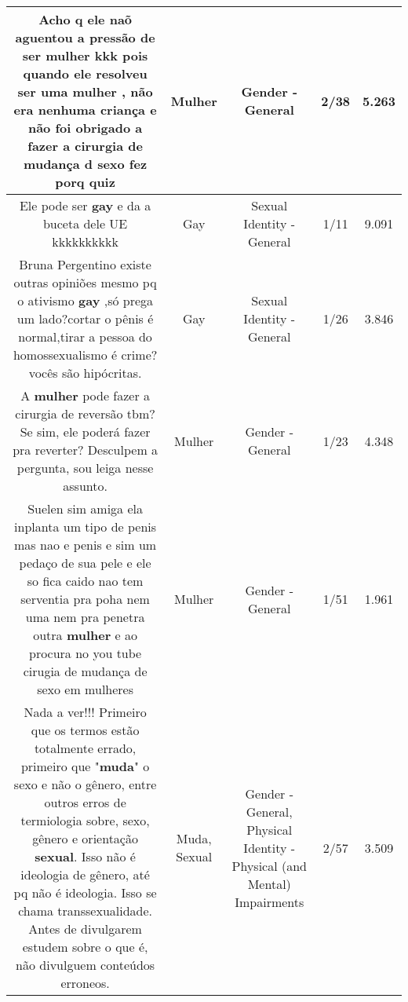 \documentclass[11pt]{article}
\newlength\mylength
\begin{document}
\begin{center}
\begin{longtable}{|C{.65\mylength}|C{.30\mylength}|C{.12\mylength}|C{.12\mylength}|C{.12\mylength}|}
  \small Acho q ele naõ aguentou a pressão de ser \textbf{mulher}  kkk pois quando ele resolveu ser uma \textbf{mulher} , não era nenhuma criança e não foi obrigado a fazer a cirurgia   de mudança d sexo   fez  porq quiz\normalsize   & Mulher & Gender - General & 2/38 & 5.263 \\  \hline
  \small Ele pode ser \textbf{gay} e da a buceta dele UE kkkkkkkkkk\normalsize   & Gay & Sexual Identity - General & 1/11 & 9.091 \\  \hline
  \small Bruna Pergentino  existe outras opiniões mesmo pq o ativismo \textbf{gay} ,só prega um lado?cortar o pênis é normal,tirar a pessoa do homossexualismo é crime?vocês são hipócritas.\normalsize   & Gay & Sexual Identity - General & 1/26 & 3.846 \\  \hline
  \small A \textbf{mulher} pode fazer a cirurgia de reversão tbm? Se sim, ele poderá fazer pra reverter? Desculpem a pergunta, sou leiga nesse assunto.\normalsize   & Mulher & Gender - General & 1/23 & 4.348 \\  \hline
  \small {} Suelen sim amiga ela inplanta um tipo de penis mas nao e penis e sim um pedaço de sua pele e ele so fica caido nao tem serventia pra poha nem uma nem pra penetra outra \textbf{mulher} e ao procura no you tube cirugia de mudança de sexo em mulheres\normalsize   & Mulher & Gender - General & 1/51 & 1.961 \\  \hline
  \small Nada a ver!!! Primeiro que os termos estão totalmente errado, primeiro que "\textbf{muda}" o sexo e não o gênero, entre outros erros de termiologia sobre, sexo, gênero e orientação \textbf{sexual}. Isso não é ideologia de gênero, até pq não é ideologia. Isso se chama transsexualidade. Antes de divulgarem estudem sobre o que é, não divulguem conteúdos erroneos.\normalsize   & Muda, Sexual & Gender - General, Physical Identity - Physical (and Mental) Impairments & 2/57 & 3.509 \\  \hline

\end{longtable}
\end{center}
\end{document}
